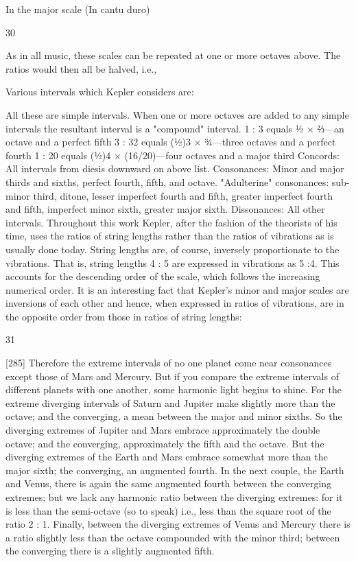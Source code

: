 \documentclass{article}
\begin{document}
In the major scale (In cantu duro)


30

As in all music, these scales can be repeated at one or more octaves above. The ratios would then all be
halved, i.e.,

Various intervals which Kepler considers are:

All these are simple intervals. When one or more octaves are added to any simple intervals the
resultant interval is a "compound" interval.
1 : 3 equals ½ × ⅔—an octave and a perfect fifth
3 : 32 equals (½)3 × ¾—three octaves and a perfect fourth
1 : 20 equals (½)4 × (16/20)—four octaves and a major third
Concords: All intervals from diesis downward on above list.
Consonances: Minor and major thirds and sixths, perfect fourth, fifth, and octave.
"Adulterine" consonances: sub-minor third, ditone, lesser imperfect fourth and fifth, greater imperfect
fourth and fifth, imperfect minor sixth, greater major sixth.
Dissonances: All other intervals.
Throughout this work Kepler, after the fashion of the theorists of his time, uses the ratios of string
lengths rather than the ratios of vibrations as is usually done today. String lengths are, of course,
inversely proportionate to the vibrations. That is, string lengths 4 : 5 are expressed in vibrations as 5
:4. This accounts for the descending order of the scale, which follows the increasing numerical order.
It is an interesting fact that Kepler's minor and major scales are inversions of each other and hence,
when expressed in ratios of vibrations, are in the opposite order from those in ratios of string lengths:


31

[285] Therefore the extreme intervals of no one planet come near
consonances except those of Mars and Mercury.
But if you compare the extreme intervals of different planets with one
another, some harmonic light begins to shine. For the extreme diverging
intervals of Saturn and Jupiter make slightly more than the octave; and
the converging, a mean between the major and minor sixths. So the
diverging extremes of Jupiter and Mars embrace approximately the
double octave; and the converging, approximately the fifth and the
octave. But the diverging extremes of the Earth and Mars embrace
somewhat more than the major sixth; the converging, an augmented
fourth. In the next couple, the Earth and Venus, there is again the same
augmented fourth between the converging extremes; but we lack any
harmonic ratio between the diverging extremes: for it is less than the
semi-octave (so to speak) i.e., less than the square root of the ratio 2 : 1.
Finally, between the diverging extremes of Venus and Mercury there is a
ratio slightly less than the octave compounded with the minor third;
between the converging there is a slightly augmented fifth.
\end{document}
